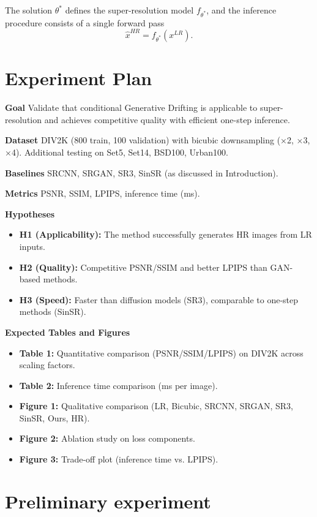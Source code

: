 \documentclass{article}
\begin{document}
The solution $\theta^{*}$ defines the super-resolution model
$f_{\theta^{*}}$, and the inference procedure consists of a single forward pass
\[
\hat{x}^{HR}=f_{\theta^{*}}(x^{LR}).
\]


\section{Experiment Plan}\label{sec:exp_plan}

\textbf{Goal}
Validate that conditional Generative Drifting is applicable to super-resolution and achieves competitive quality with efficient one-step inference.

\textbf{Dataset}
DIV2K (800 train, 100 validation) with bicubic downsampling (×2, ×3, ×4). Additional testing on Set5, Set14, BSD100, Urban100.

\textbf{Baselines}
SRCNN, SRGAN, SR3, SinSR (as discussed in Introduction).

\textbf{Metrics}
PSNR, SSIM, LPIPS, inference time (ms).

\textbf{Hypotheses}
\begin{itemize}
    \item \textbf{H1 (Applicability):} The method successfully generates HR images from LR inputs.
    \item \textbf{H2 (Quality):} Competitive PSNR/SSIM and better LPIPS than GAN-based methods.
    \item \textbf{H3 (Speed):} Faster than diffusion models (SR3), comparable to one-step methods (SinSR).
\end{itemize}

\textbf{Expected Tables and Figures}
\begin{itemize}
    \item \textbf{Table 1:} Quantitative comparison (PSNR/SSIM/LPIPS) on DIV2K across scaling factors.
    \item \textbf{Table 2:} Inference time comparison (ms per image).
    \item \textbf{Figure 1:} Qualitative comparison (LR, Bicubic, SRCNN, SRGAN, SR3, SinSR, Ours, HR).
    \item \textbf{Figure 2:} Ablation study on loss components.
    \item \textbf{Figure 3:} Trade-off plot (inference time vs. LPIPS).
\end{itemize}
\section{Preliminary experiment}\label{sec:exp}
\end{document}
